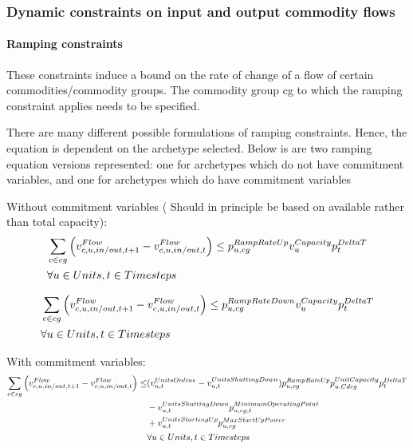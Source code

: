 \documentclass[10pt,english]{article}
\begin{document}
\subsubsection{Dynamic constraints on input and output commodity flows}
\paragraph{Ramping constraints} These constraints induce a bound on the rate of change of a flow of certain commodities/commodity groups. The commodity group cg to which the ramping constraint applies needs to be specified.

There are many different possible formulations of ramping constraints. Hence, the equation is dependent on the archetype selected. Below is are two ramping equation versions represented: one for archetypes which do not have commitment variables, and one for archetypes which do have commitment variables

Without commitment variables ({\color{red} Should in principle be based on available rather than total capacity}):
\begin{align} \label{eq:updwardrampingconstraintwithoutcommitmentvariables}
&\sum_{\commodity \in cg} \Big( \vFlow[\commodity,\unit,in/out,\timestep+1] - \vFlow \Big) \le \pRampRateUp \vCapacity \pDeltaT \nonumber \\
&\forall \units, \timesteps
\end{align}

\begin{align} \label{eq:downdwardrampingconstraintwithoutcommitmentvariables}
&\sum_{\commodity \in cg} \Big( \vFlow[\commodity,\unit,in/out,\timestep+1] - \vFlow \Big) \le \pRampRateDown \vCapacity \pDeltaT\nonumber \\
& \forall \units, \timesteps
\end{align}



With commitment variables:
\begin{align} \label{eq:updwardrampingconstraintwithcommitmentvariables}
\sum_{\commodity \in cg} \Big( \vFlow[\commodity,\unit,in/out,\timestep+1] - \vFlow \Big) \le & (\vUnitsOnline-\vUnitsShuttingDown) \pRampRateUp \pUnitCapacity \pDeltaT \nonumber \\
& - \vUnitsShuttingDown \pMinimumOperatingPoint \nonumber \\
& +\vUnitsStartingUp \pMaxStartUpPower \nonumber \\
& \forall \units, \timesteps
\end{align}
\end{document}
